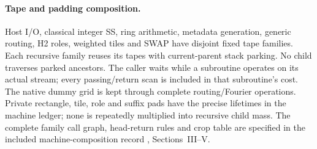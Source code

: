 \documentclass[11pt]{article}
\begin{document}
\paragraph{Tape and padding composition.}
Host I/O, classical integer SS, ring arithmetic, metadata generation, generic routing,
H2 roles, weighted tiles and SWAP have disjoint fixed tape families.
Each recursive family reuses its tapes with current-parent stack
parking. No child traverses parked ancestors. The caller waits while
a subroutine operates on its actual stream; every passing/return scan
is included in that subroutine's cost. The native dummy grid is kept
through complete routing/Fourier operations. Private rectangle, tile,
role and suffix pads have the precise lifetimes in the machine ledger;
none is repeatedly multiplied into recursive child mass.
The complete family call graph, head-return rules and crop table are
specified in the included machine-composition record
,
Sections~III--V.
\end{document}
